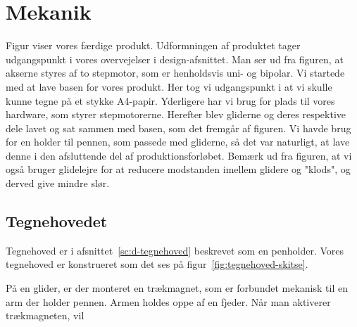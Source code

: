 \chapter[Implementering af mekanik]{Mekanik}


Figur  viser vores færdige produkt.
Udformningen af produktet tager udgangspunkt i vores overvejelser i design-afsnittet.
Man ser ud fra figuren, at akserne styres af to stepmotor, som er henholdsvis uni- og bipolar.
Vi startede med at lave basen for vores produkt. Her tog vi udgangspunkt i at vi skulle kunne
tegne på et stykke A4-papir. Yderligere har vi brug for plads til vores hardware, som styrer
stepmotorerne. Herefter blev gliderne og deres respektive dele lavet og sat sammen med basen,
som det fremgår af figuren. Vi havde brug for en holder til pennen, som passede med gliderne,
så det var naturligt, at lave denne i den afsluttende del af produktionsforløbet. Bemærk ud
fra figuren, at vi også bruger glidelejre for at reducere modstanden imellem glidere og "klods",
og derved give mindre slør.

\section{Tegnehovedet}
Tegnehoved er i afsnittet~\vref{sc:d-tegnehoved} beskrevet som en
penholder. Vores tegnehoved er konstrueret som det ses på
figur~\vref{fig:tegnehoved-skitse}.

På en glider, er der monteret en trækmagnet, som er forbundet mekanisk
til en arm der holder pennen. Armen holdes oppe af en fjeder. Når man aktiverer trækmagneten, vil 


